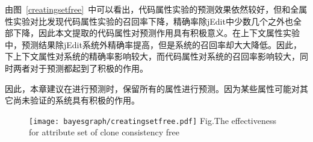 由图~\ref{creatingsetfree}~中可以看出，代码属性实验的预测效果依然较好，但和全属性实验对比发现代码属性实验的召回率下降，精确率除jEdit中少数几个之外也全部下降，因此本文提取的代码属性对预测作用具有积极意义。在上下文属性实验中，预测结果除jEdit系统外精确率提高，但是系统的召回率却大大降低。因此，下上下文属性对系统的精确率影响较大，而代码属性对系统的召回率影响较大，同时两者对于预测都起到了积极的作用。

因此，本章建议在进行预测时，保留所有的属性进行预测。因为某些属性可能对其它尚未验证的系统具有积极的作用。


\begin{figure}[htbp]
\centering
\texttt{[image: bayesgraph/creatingsetfree.pdf]}
{Fig.$\!$}{The effectiveness for attribute set of clone consistency free}
\vspace{-1em}
\end{figure}



